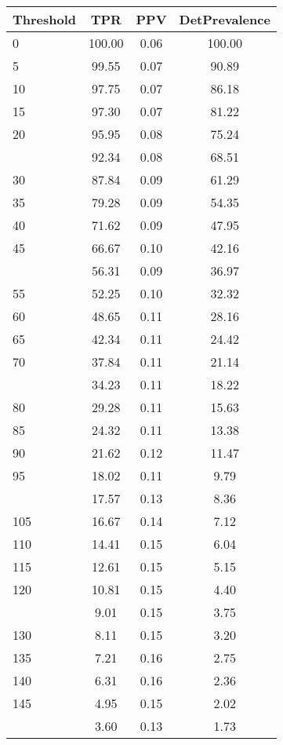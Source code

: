 \begin{table}[ht]
\centering
\begin{tabular}{lccc}
  \toprule
Threshold & TPR & PPV & DetPrevalence \\ 
  \midrule
0 & 100.00 & 0.06 & 100.00 \\ 
  5 & 99.55 & 0.07 & 90.89 \\ 
  10 & 97.75 & 0.07 & 86.18 \\ 
  15 & 97.30 & 0.07 & 81.22 \\ 
  20 & 95.95 & 0.08 & 75.24 \\ 
   \addlinespace
25 & 92.34 & 0.08 & 68.51 \\ 
  30 & 87.84 & 0.09 & 61.29 \\ 
  35 & 79.28 & 0.09 & 54.35 \\ 
  40 & 71.62 & 0.09 & 47.95 \\ 
  45 & 66.67 & 0.10 & 42.16 \\ 
   \addlinespace
50 & 56.31 & 0.09 & 36.97 \\ 
  55 & 52.25 & 0.10 & 32.32 \\ 
  60 & 48.65 & 0.11 & 28.16 \\ 
  65 & 42.34 & 0.11 & 24.42 \\ 
  70 & 37.84 & 0.11 & 21.14 \\ 
   \addlinespace
75 & 34.23 & 0.11 & 18.22 \\ 
  80 & 29.28 & 0.11 & 15.63 \\ 
  85 & 24.32 & 0.11 & 13.38 \\ 
  90 & 21.62 & 0.12 & 11.47 \\ 
  95 & 18.02 & 0.11 & 9.79 \\ 
   \addlinespace
100 & 17.57 & 0.13 & 8.36 \\ 
  105 & 16.67 & 0.14 & 7.12 \\ 
  110 & 14.41 & 0.15 & 6.04 \\ 
  115 & 12.61 & 0.15 & 5.15 \\ 
  120 & 10.81 & 0.15 & 4.40 \\ 
   \addlinespace
125 & 9.01 & 0.15 & 3.75 \\ 
  130 & 8.11 & 0.15 & 3.20 \\ 
  135 & 7.21 & 0.16 & 2.75 \\ 
  140 & 6.31 & 0.16 & 2.36 \\ 
  145 & 4.95 & 0.15 & 2.02 \\ 
   \addlinespace
150 & 3.60 & 0.13 & 1.73 \\ 

\end{tabular}
\end{table}
